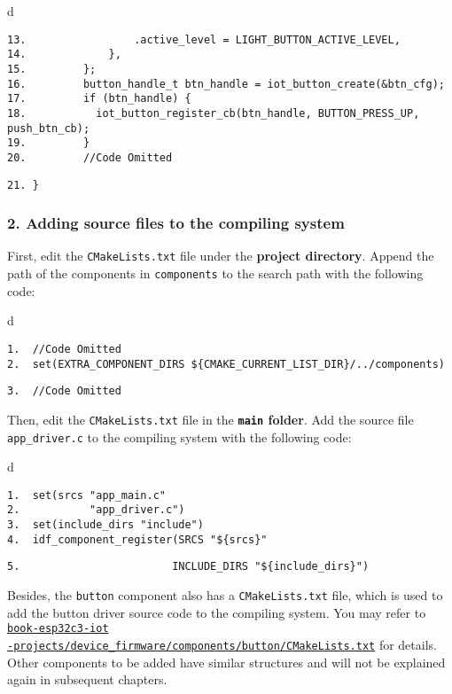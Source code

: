 \documentclass[a4paper,12pt]{book}
\begin{document}
\begin{codebloc}
\begin{tabular}{d}
\vspace{2pt}
\begin{verbatim}
13.                 .active_level = LIGHT_BUTTON_ACTIVE_LEVEL,
14.             },
15.         };
16.         button_handle_t btn_handle = iot_button_create(&btn_cfg);
17.         if (btn_handle) {
18.           iot_button_register_cb(btn_handle, BUTTON_PRESS_UP, push_btn_cb);
19.         }
20.         //Code Omitted
\end{verbatim}
\verb|21. }|
\end{tabular}
\end{codebloc}

\subsubsection{2. Adding source files to the compiling system}
First, edit the \verb|CMakeLists.txt| file under the \textbf{project directory}. Append the path of the components in \verb|components| to the search path with the following code:

\begin{codebloc}
\begin{tabular}{d}
\vspace{2pt}
\begin{verbatim}
1.  //Code Omitted
2.  set(EXTRA_COMPONENT_DIRS ${CMAKE_CURRENT_LIST_DIR}/../components)	
\end{verbatim}
\verb|3.  //Code Omitted|
\end{tabular}
\end{codebloc}

Then, edit the \verb|CMakeLists.txt| file in the \textbf{\texttt{main} folder}. Add the source file \verb|app_driver.c| to the compiling system with the following code:

\begin{codebloc}
\begin{tabular}{d}
\vspace{2pt}
\begin{verbatim}
1.  set(srcs "app_main.c"
2.           "app_driver.c")
3.  set(include_dirs "include")
4.  idf_component_register(SRCS "${srcs}"
\end{verbatim}
\verb|5.                        INCLUDE_DIRS "${include_dirs}")|
\end{tabular}
\end{codebloc}

Besides, the \verb|button| component also has a \verb|CMakeLists.txt| file, which is used to add the button driver source code to the compiling system. You may refer to \href{https://github.com/espressif/book-esp32c3-iot-projects/blob/main/device_firmware/components/button/CMakeLists.txt}{\texttt{book-esp32c3-iot\\ -projects/device\_firmware/components/button/CMakeLists.txt}} for details. Other components to be added have similar structures and will not be explained again in subsequent chapters.
\end{document}
